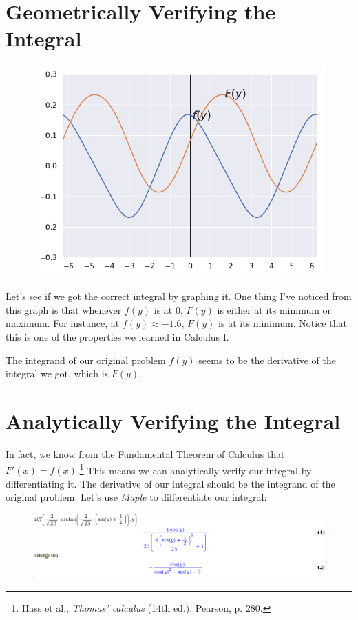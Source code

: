 \section*{Geometrically Verifying the Integral}

\begin{figure}
	\centering
	\caption[Figure 1. The integrand and the integral.]{}
	\includegraphics[width=0.7\linewidth]{graph_1}
	\label{fig:graph1}
\end{figure}

Let's see if we got the correct integral
by graphing it. One thing I've noticed
from this graph is that whenever $ f(y) $ is at $ 0 $, 
$ F(y) $ is either at its minimum or maximum.
For instance, at $ f(y) \approx -1.6 $,
$F(y)$ is at its minimum.
Notice that this is one of the properties we learned
in Calculus I. 

The integrand
of our original problem $ f(y) $ seems to be the
derivative of the integral we got, which is $ F(y) $.

\newpage

\section*{Analytically Verifying the Integral}

In fact, we know from the Fundamental Theorem of Calculus
that $ F'(x) = f(x) $.\footnote{
	Hass et al., \textit{Thomas' calculus} (14th ed.), Pearson, p. 280.
} This means we can analytically verify our integral by differentiating it. 
The derivative of our integral should be
the integrand of the original problem.
Let's use \textit{Maple} to
differentiate our integral: 
\begin{figure}
	\centering
	\includegraphics[width=0.98\linewidth]{maple}
	\caption{}
	\label{fig:maple}
\end{figure}

